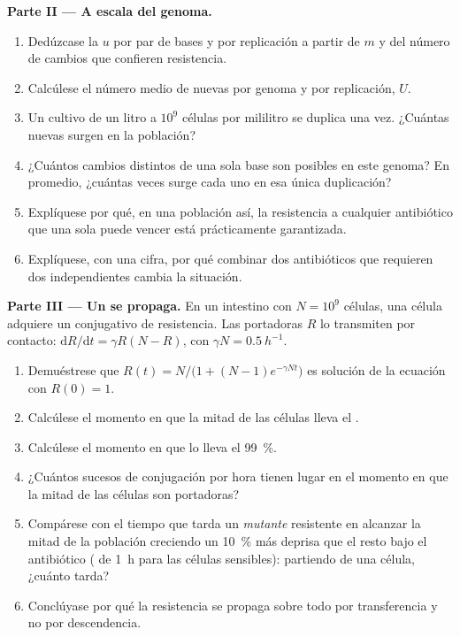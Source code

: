 \begin{problem}
\medskip
\noindent\textbf{Parte II --- A escala del genoma.}
\begin{enumerate}[resume]
  \item Dedúzcase la  $u$ por par de bases y por
        replicación a partir de $m$ y del número de cambios que confieren
        resistencia.
  \item Calcúlese el número medio de  nuevas por genoma y por
        replicación, $U$.
  \item Un cultivo de un litro a $10^{9}$ células por mililitro se duplica
        una vez. ¿Cuántas  nuevas surgen en la población?
  \item ¿Cuántos cambios distintos de una sola base son posibles en este
        genoma? En promedio, ¿cuántas veces surge cada uno en esa única
        duplicación?
  \item Explíquese por qué, en una población así, la resistencia a
        cualquier antibiótico que una sola  puede vencer está
        prácticamente garantizada.
  \item Explíquese, con una cifra, por qué combinar dos antibióticos que
        requieren dos  independientes cambia la situación.
\end{enumerate}

\medskip
\noindent\textbf{Parte III --- Un  se propaga.}
En un intestino con $N = 10^{9}$ células, una célula adquiere un 
conjugativo de resistencia. Las portadoras $R$ lo transmiten por contacto:
$\mathrm{d}R/\mathrm{d}t = \gamma R(N - R)$, con $\gamma N =
\qty{0.5}{h^{-1}}$.
\begin{enumerate}[resume]
  \item Demuéstrese que $R(t) = N/\bigl(1 + (N - 1)e^{-\gamma N t}\bigr)$
        es solución de la ecuación con $R(0) = 1$.
  \item Calcúlese el momento en que la mitad de las células lleva el
        .
  \item Calcúlese el momento en que lo lleva el \qty{99}{\%}.
  \item ¿Cuántos sucesos de conjugación por hora tienen lugar en el
        momento en que la mitad de las células son portadoras?
  \item Compárese con el tiempo que tarda un \emph{mutante} resistente en
        alcanzar la mitad de la población creciendo un \qty{10}{\%} más
        deprisa que el resto bajo el antibiótico ( de
        \qty{1}{h} para las células sensibles): partiendo de una célula,
        ¿cuánto tarda?
  \item Conclúyase por qué la resistencia se propaga sobre todo por
        transferencia y no por descendencia.
\end{enumerate}


\end{problem}
